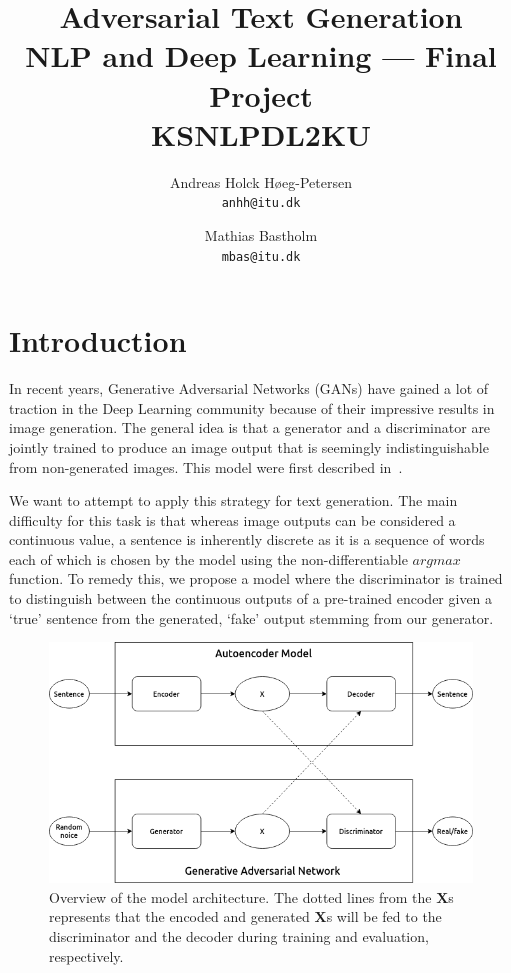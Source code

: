 \documentclass{article}
\title{%
    Adversarial Text Generation\\
    \large NLP and Deep Learning --- Final Project\\
    \small KSNLPDL2KU
}
\author{%
    Andreas Holck Høeg-Petersen\\
    \texttt{anhh@itu.dk}
    \and
    Mathias Bastholm\\
    \texttt{mbas@itu.dk}
}
\begin{document}
\maketitle

\section{Introduction}\label{sec:introduction}

In recent years, Generative Adversarial Networks (GANs) have gained a lot of
traction in the Deep Learning community because of their impressive results in
image generation. The general idea is that a generator and a discriminator are
jointly trained to produce an image output that is seemingly indistinguishable
from non-generated images. This model were first described
in~\cite{Goodfellow2014GenerativeAN}.

We want to attempt to apply this strategy for text generation. The main
difficulty for this task is that whereas image outputs can be considered a
continuous value, a sentence is inherently discrete as it is a sequence of words
each of which is chosen by the model using the non-differentiable $argmax$
function. To remedy this, we propose a model where the discriminator is trained
to distinguish between the continuous outputs of a pre-trained encoder given a
`true' sentence from the generated, `fake' output stemming from our generator.

\begin{figure}[h]
    \includegraphics[width=\textwidth]{projectModel.png}
    \caption{%
        Overview of the model architecture. The dotted lines from the
        $\mathbf{X}$s represents that the encoded and generated $\mathbf{X}$s
        will be fed to the discriminator and the decoder during training and
        evaluation, respectively.
    }\label{fig:projectModel}
\end{figure}
\end{document}
